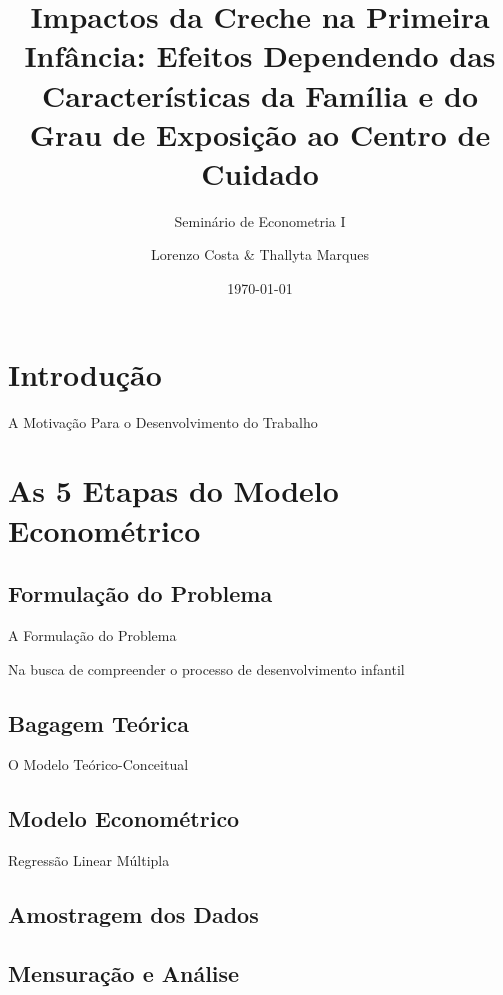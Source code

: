 \documentclass{beamer}
\title{Impactos da Creche na Primeira Infância: Efeitos Dependendo das Características da Família e do Grau de Exposição ao Centro de Cuidado}
\subtitle{Seminário de Econometria I}
\author{Lorenzo Costa \& Thallyta Marques}
\institute{Universidade Federal do Tocantins}
\date{\today}
\begin{document}
	
\titlepage

\section{Introdução}
\begin{frame}{A Motivação Para o Desenvolvimento do Trabalho}
\end{frame}

\section{As 5 Etapas do Modelo Econométrico}
	
	\subsection{Formulação do Problema}
	
\begin{frame}{A Formulação do Problema}
	
Na busca de compreender o processo de desenvolvimento infantil
	
\end{frame}	


	\subsection{Bagagem Teórica}
	
\begin{frame}{O Modelo Teórico-Conceitual }
	
\end{frame}

	\subsection{Modelo Econométrico}
	
\begin{frame}{Regressão Linear Múltipla}
	
\end{frame}

	\subsection{Amostragem dos Dados}
	
\begin{frame}
	
\end{frame}

	\subsection{Mensuração e Análise}
	
\begin{frame}
		
\end{frame}
	
\end{document}
